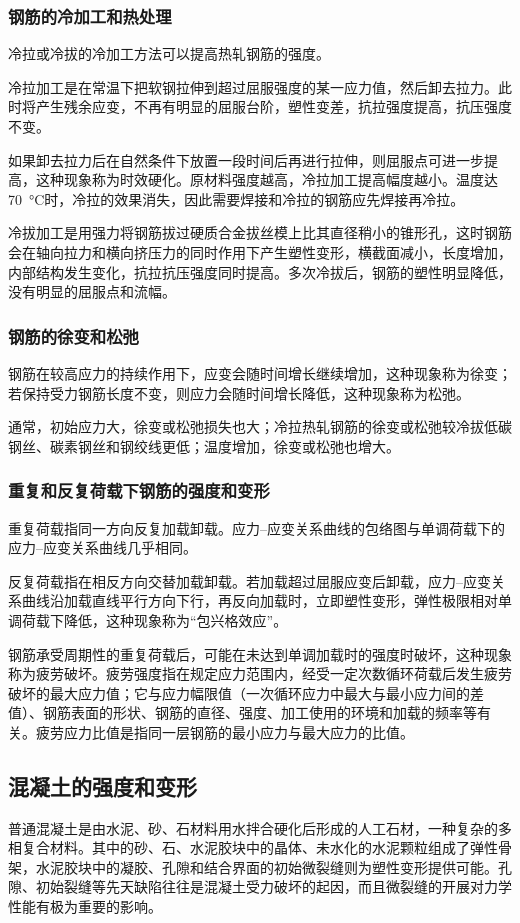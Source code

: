 \documentclass{article}
\begin{document}
\subsubsection{钢筋的冷加工和热处理}
\par 冷拉或冷拔的冷加工方法可以提高热轧钢筋的强度。
\par 冷拉加工是在常温下把软钢拉伸到超过屈服强度的某一应力值，然后卸去拉力。此时将产生残余应变，不再有明显的屈服台阶，塑性变差，抗拉强度提高，抗压强度不变。
\par 如果卸去拉力后在自然条件下放置一段时间后再进行拉伸，则屈服点可进一步提高，这种现象称为时效硬化。原材料强度越高，冷拉加工提高幅度越小。温度达\SI{70}{\degreeCelsius}时，冷拉的效果消失，因此需要焊接和冷拉的钢筋应先焊接再冷拉。
\par 冷拔加工是用强力将钢筋拔过硬质合金拔丝模上比其直径稍小的锥形孔，这时钢筋会在轴向拉力和横向挤压力的同时作用下产生塑性变形，横截面减小，长度增加，内部结构发生变化，抗拉抗压强度同时提高。多次冷拔后，钢筋的塑性明显降低，没有明显的屈服点和流幅。
\subsubsection{钢筋的徐变和松弛}
\par 钢筋在较高应力的持续作用下，应变会随时间增长继续增加，这种现象称为徐变；若保持受力钢筋长度不变，则应力会随时间增长降低，这种现象称为松弛。
\par 通常，初始应力大，徐变或松弛损失也大；冷拉热轧钢筋的徐变或松弛较冷拔低碳钢丝、碳素钢丝和钢绞线更低；温度增加，徐变或松弛也增大。
\subsubsection{重复和反复荷载下钢筋的强度和变形}
\par 重复荷载指同一方向反复加载卸载。应力--应变关系曲线的包络图与单调荷载下的应力--应变关系曲线几乎相同。
\par 反复荷载指在相反方向交替加载卸载。若加载超过屈服应变后卸载，应力--应变关系曲线沿加载直线平行方向下行，再反向加载时，立即塑性变形，弹性极限相对单调荷载下降低，这种现象称为“包兴格效应”。
\par 钢筋承受周期性的重复荷载后，可能在未达到单调加载时的强度时破坏，这种现象称为疲劳破坏。疲劳强度指在规定应力范围内，经受一定次数循环荷载后发生疲劳破坏的最大应力值；它与应力幅限值（一次循环应力中最大与最小应力间的差值）、钢筋表面的形状、钢筋的直径、强度、加工使用的环境和加载的频率等有关。疲劳应力比值是指同一层钢筋的最小应力与最大应力的比值。
\subsection{混凝土的强度和变形}
\par 普通混凝土是由水泥、砂、石材料用水拌合硬化后形成的人工石材，一种复杂的多相复合材料。其中的砂、石、水泥胶块中的晶体、未水化的水泥颗粒组成了弹性骨架，水泥胶块中的凝胶、孔隙和结合界面的初始微裂缝则为塑性变形提供可能。孔隙、初始裂缝等先天缺陷往往是混凝土受力破坏的起因，而且微裂缝的开展对力学性能有极为重要的影响。
\end{document}
